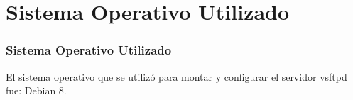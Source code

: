 \section{Sistema Operativo Utilizado}
  \begin{frame}
    \frametitle{Sistema Operativo Utilizado}
    El sistema operativo que se utilizó para montar y configurar el servidor vsftpd fue: Debian 8.
    
  \end{frame}